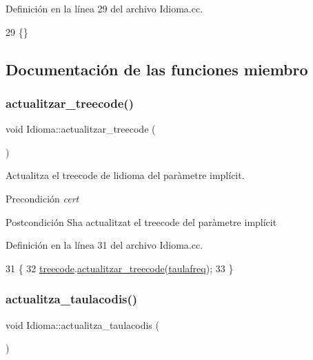 Definición en la línea 29 del archivo Idioma.\+cc.


\begin{DoxyCode}
29 \{\}
\end{DoxyCode}


\subsection{Documentación de las funciones miembro}
\mbox{\label{class_idioma_a227386152fe1be34cd3a0a7fce4c4c95}} 
\subsubsection{\texorpdfstring{actualitzar\+\_\+treecode()}{actualitzar\_treecode()}}
{\footnotesize\ttfamily void Idioma\+::actualitzar\+\_\+treecode (\begin{DoxyParamCaption}{ }\end{DoxyParamCaption})}



Actualitza el treecode de l\textquotesingle{}idioma del paràmetre implícit. 

\begin{DoxyPrecond}{Precondición}
{\itshape cert} 
\end{DoxyPrecond}
\begin{DoxyPostcond}{Postcondición}
S\textquotesingle{}ha actualitzat el treecode del paràmetre implícit 
\end{DoxyPostcond}


Definición en la línea 31 del archivo Idioma.\+cc.


\begin{DoxyCode}
31                                  \{
32     \hyperlink{class_idioma_ab80d7ef5fec4c922bc65e97e6e3bf968}{treecode}.\hyperlink{class_treecode_a9b9e9d2f0cce1d4293a7e28ab0ba76f7}{actualitzar\_treecode}(\hyperlink{class_idioma_a51e5f7366342e04f3dae8a4f0fdcca60}{taulafreq});
33 \}
\end{DoxyCode}
\mbox{\label{class_idioma_ac089a0e4b79ca8f3df040e204a3de7dd}} 
\subsubsection{\texorpdfstring{actualitza\+\_\+taulacodis()}{actualitza\_taulacodis()}}
{\footnotesize\ttfamily void Idioma\+::actualitza\+\_\+taulacodis (\begin{DoxyParamCaption}{ }\end{DoxyParamCaption})}



